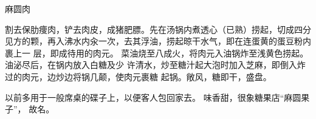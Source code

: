 \begin{recipe}{麻圆肉}

\ingredients


\preparation

\step 割去保肋痩肉，铲去肉皮，成猪肥膘。先在汤锅内煮透心（已熟）捞起，切成四分
见方的颗，再入沸水内汆一次，去其浮油，捞起晾干水气，即在连蛋黄的蛋豆粉内裹上一
层，即成待用的肉元。
\step 菜油烧至八成火，将肉元入油锅炸至浅黄色捞起。油泌尽后，在锅内放入白糖及少
许清水，炒至糖汁起大泡时加入芝麻，即倒入炸过的肉元，边炒边将锅几颠，使肉元裹糖
起锅。敞风，糖即干，盛盘。

\features

以前多用于一般席桌的碟子上，以便客人包回家去。 味香甜，很象糖果店“麻圆果子”，
故名。

\end{recipe}

